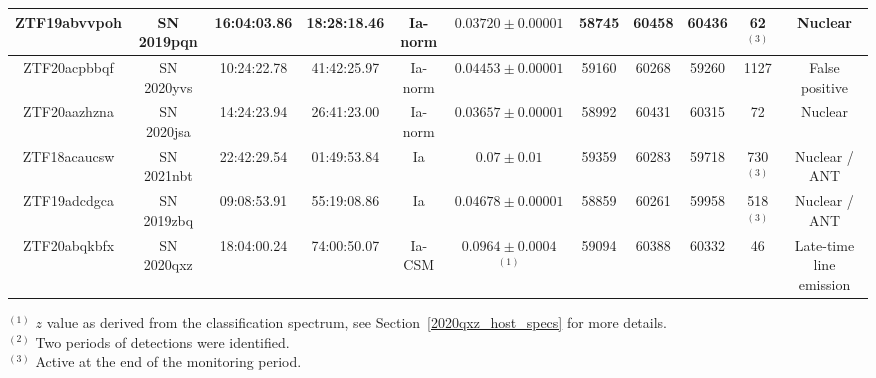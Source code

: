 \documentclass[a4paper,oneside,12pt, class=Latex/Classes/PhDthesisPSnPDF, crop=false]{standalone}
\begin{document}
\begin{table}
{\begin{tabular}{ccccccccccc}
        ZTF19abvvpoh & SN 2019pqn & 16:04:03.86 & 18:28:18.46 & Ia-norm & $0.03720\pm0.00001$ & 58745 & 60458 & 60436 & 62 $^{(3)}$ & Nuclear\\
        \hline
        ZTF20acpbbqf & SN 2020yvs & 10:24:22.78 & 41:42:25.97 & Ia-norm & $0.04453\pm0.00001$ & 59160 & 60268 & 59260 & 1127 & False positive\\
        ZTF20aazhzna & SN 2020jsa & 14:24:23.94 & 26:41:23.00 & Ia-norm & $0.03657\pm0.00001$ & 58992 & 60431 & 60315 & 72 & Nuclear\\
        ZTF18acaucsw & SN 2021nbt & 22:42:29.54 & 01:49:53.84 & Ia & $0.07\pm0.01$ & 59359 & 60283 & 59718 & 730 $^{(3)}$ & Nuclear / ANT\\
        ZTF19adcdgca & SN 2019zbq & 09:08:53.91 & 55:19:08.86 & Ia & $0.04678\pm0.00001$ & 58859 & 60261 & 59958 & 518 $^{(3)}$ & Nuclear / ANT \\
        ZTF20abqkbfx & SN 2020qxz & 18:04:00.24 & 74:00:50.07 & Ia-CSM & $0.0964\pm0.0004$ $^{(1)}$ & 59094 & 60388 & 60332 & 46 & Late-time line emission \\
        \hline
    \end{tabular}
    }
    \begin{flushleft}
        $^{(1)}$ $z$ value as derived from the classification spectrum, see Section~\ref{2020qxz_host_specs} for more details.\\
        $^{(2)}$ Two periods of detections were identified.\\
        $^{(3)}$ Active at the end of the monitoring period.
    \end{flushleft}
    \label{found_objs}
\end{table}
\end{document}

